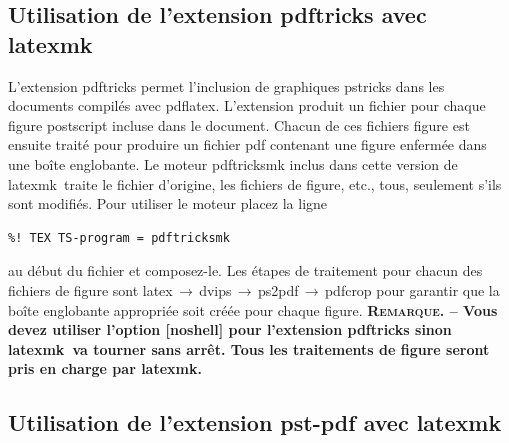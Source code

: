 \documentclass[11pt,french]{article}
\newcommand{\latexmk}{\textsf{latexmk}}
\newcommand{\cmd}[1]{\textsf{#1}}
\newcommand{\To}{\,\(\to\)\,}
\begin{document}
\subsection{Utilisation de l'extension \cmd{pdftricks} avec \latexmk}

L'extension \cmd{pdftricks} permet l'inclusion de graphiques \cmd{pstricks} dans les documents compilés avec \cmd{pdflatex}. L'extension produit un fichier pour chaque figure postscript incluse dans le document. Chacun de ces fichiers figure est ensuite traité pour produire un fichier \cmd{pdf} contenant une figure enfermée dans une boîte englobante. Le moteur \cmd{pdftricksmk} inclus dans cette version de \latexmk\ traite le fichier d'origine, les fichiers de figure, etc., tous, seulement s'ils sont modifiés. Pour utiliser le moteur placez la ligne
\begin{verbatim}
%! TEX TS-program = pdftricksmk
\end{verbatim}
au début du fichier et composez-le. Les étapes de traitement pour chacun des fichiers de figure sont \cmd{latex}\To\cmd{dvips}\To\cmd{ps2pdf}\To\cmd{pdfcrop} pour garantir que la boîte englobante appropriée soit créée pour chaque figure. \textbf{\textsc{Remarque}. -- Vous devez utiliser l'option [\cmd{noshell}] pour l'extension \cmd{pdftricks} sinon \latexmk\ va tourner sans arrêt. Tous les traitements de figure seront pris en charge par \latexmk.}

%


\subsection{Utilisation de l'extension \cmd{pst-pdf} avec \latexmk}
\end{document}

